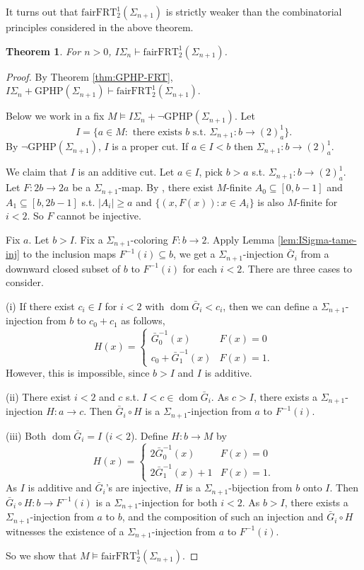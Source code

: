 \documentclass[twoside,a4paper]{amsart}
\newtheorem{theorem}{Theorem}[section]
\theoremstyle{definition}
\theoremstyle{theorem}
\numberwithin{equation}{section}
\newcommand{\<}{\langle}
\renewcommand{\>}{\rangle}
\newcommand{\dom}{\operatorname{dom}}
\newcommand{\GPHP}{\mathrm{GPHP}}
\newcommand{\fairFRT}{\mathrm{fairFRT}}
\begin{document}
It turns out that $\fairFRT^1_2(\Sigma_{n+1})$ is strictly weaker than the combinatorial principles considered in the above theorem.

\begin{theorem}\label{thm:ISigma-fairFRT}
For $n > 0$, $I\Sigma_n \vdash \fairFRT^1_2(\Sigma_{n+1})$.
\end{theorem}

\begin{proof}
By Theorem \ref{thm:GPHP-FRT},
$
  I\Sigma_n + \GPHP(\Sigma_{n+1}) \vdash \fairFRT^1_2(\Sigma_{n+1}).
$

Below we work in a fix
$
  M \models I\Sigma_n + \neg \GPHP(\Sigma_{n+1}).
$
Let
\[
  I = \{a \in M: \text{ there exists } b \text{ s.t. } \Sigma_{n+1}: b \to (2)^1_a\}.
\]
By $\neg \GPHP(\Sigma_{n+1})$, $I$ is a proper cut.
If $a \in I < b$ then $\Sigma_{n+1}: b \to (2)^1_a$.

We claim that $I$ is an additive cut.
Let $a \in I$, pick $b > a$ s.t. $\Sigma_{n+1}: b \to (2)^1_a$.
Let $F: 2b \to 2a$ be a $\Sigma_{n+1}$-map.
By \cite[Lemma 2.4(5)]{BCWWY:2021}, there exist $M$-finite $A_0 \subseteq [0,b-1]$ and $A_1 \subseteq [b,2b-1]$ s.t.
$|A_i| \geq a$ and $\{(x,F(x)): x \in A_i\}$ is also $M$-finite for $i < 2$.
So $F$ cannot be injective.

Fix $a$.
Let $b > I$.
Fix a $\Sigma_{n+1}$-coloring $F: b \to 2$.
Apply Lemma \ref{lem:ISigma-tame-inj} to the inclusion maps $F^{-1}(i) \subseteq b$, we get a $\Sigma_{n+1}$-injection $\bar{G}_i$ from a downward closed subset of $b$ to $F^{-1}(i)$ for each $i < 2$.
There are three cases to consider.

(i)
If there exist $c_i \in I$ for $i < 2$ with $\dom \bar{G}_i < c_i$, then we can define a $\Sigma_{n+1}$-injection from $b$ to $c_0 + c_1$ as follows,
\[
  H(x) =
  \begin{cases}
    \bar{G}_0^{-1}(x) & F(x) = 0 \\
    c_0 + \bar{G}_1^{-1}(x) & F(x) = 1.
  \end{cases}
\]
However, this is impossible, since $b > I$ and $I$ is additive.

(ii)
There exist $i < 2$ and $c$ s.t. $I < c \in \dom \bar{G}_i$.
As $c > I$, there exists a $\Sigma_{n+1}$-injection $H: a \to c$.
Then $\bar{G}_i \circ H$ is a $\Sigma_{n+1}$-injection from $a$ to $F^{-1}(i)$.

(iii)
Both $\dom \bar{G}_i = I$ ($i < 2$).
Define $H: b \to M$ by
\[
  H(x) =
  \begin{cases}
    2 \bar{G}_0^{-1}(x) & F(x) = 0 \\
    2 \bar{G}_1^{-1}(x) + 1 & F(x) = 1.
  \end{cases}
\]
As $I$ is additive and $\bar{G}_i$'s are injective, $H$ is a $\Sigma_{n+1}$-bijection from $b$ onto $I$.
Then $\bar{G}_i \circ H: b \to F^{-1}(i)$ is a $\Sigma_{n+1}$-injection for both $i < 2$.
As $b > I$, there exists a $\Sigma_{n+1}$-injection from $a$ to $b$, and the composition of such an injection and $\bar{G}_i \circ H$ witnesses the existence of a $\Sigma_{n+1}$-injection from $a$ to $F^{-1}(i)$.

So we show that $M \models \fairFRT^1_2(\Sigma_{n+1})$.
\end{proof}
\end{document}
